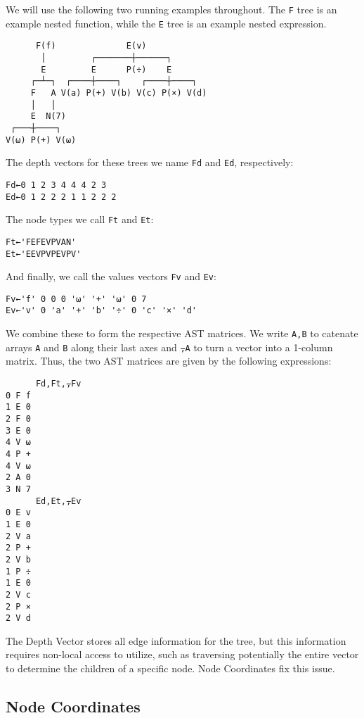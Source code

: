 \documentclass[numbers,preprint]{sigplanconf}
\begin{document}
We will use the following two running examples throughout. The \verb;F; 
tree is an example nested function, while the \verb;E; tree is an example 
nested expression.

\begin{verbatim}
      F(f)              E(v)
       │         ┌───────┼──────┐
       E         E      P(÷)    E
     ┌─┴─┐  ┌────┼────┐    ┌────┼────┐
     F   A V(a) P(+) V(b) V(c) P(×) V(d)
     │   │
     E  N(7) 
 ┌───┼────┐
V(⍵) P(+) V(⍵)
\end{verbatim}

The depth vectors for these trees we name \verb;Fd; and \verb;Ed;, respectively:

\begin{verbatim}
Fd←0 1 2 3 4 4 4 2 3
Ed←0 1 2 2 2 1 1 2 2 2
\end{verbatim}

The node types we call \verb;Ft; and \verb;Et;:

\begin{verbatim}
Ft←'FEFEVPVAN'
Et←'EEVPVPEVPV'
\end{verbatim}

And finally, we call the values vectors \verb;Fv; and \verb;Ev;:

\begin{verbatim}
Fv←'f' 0 0 0 '⍵' '+' '⍵' 0 7
Ev←'v' 0 'a' '+' 'b' '÷' 0 'c' '×' 'd'
\end{verbatim}

We combine these to form the respective AST matrices. We write \verb;A,B;
to catenate arrays \verb;A; and \verb;B; along their last axes and \verb;⍪A; to turn a
vector into a 1-column matrix. Thus, the two AST matrices are given
by the following expressions:

\begin{verbatim}
      Fd,Ft,⍪Fv
0 F f
1 E 0
2 F 0
3 E 0
4 V ⍵
4 P +
4 V ⍵
2 A 0
3 N 7
      Ed,Et,⍪Ev
0 E v
1 E 0
2 V a
2 P +
2 V b
1 P ÷
1 E 0
2 V c
2 P ×
2 V d
\end{verbatim}

The Depth Vector stores all edge information for the tree, but this information 
requires non-local access to utilize, such as traversing potentially the 
entire vector to determine the children of a specific node.
Node Coordinates fix this issue.

\subsection{Node Coordinates}
\end{document}
